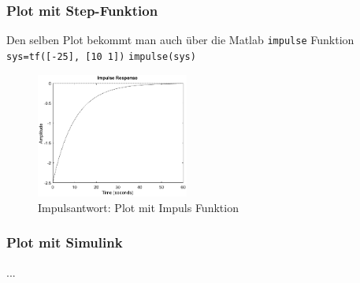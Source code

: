 \subsubsection{Plot mit Step-Funktion}
Den selben Plot bekommt man auch über die Matlab \texttt{impulse} Funktion\\
\texttt{sys=tf([-25], [10 1])}
\texttt{impulse(sys)}
\begin{figure}[H]
    \centering
    \includegraphics[width=5cm]{image/ImpulsantwortPlotmitImpulsFunktion.eps}
    \caption{Impulsantwort: Plot mit Impuls Funktion}
\end{figure}

\subsubsection{Plot mit Simulink}
...
